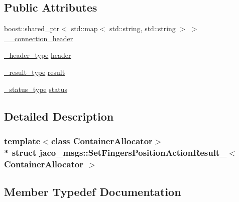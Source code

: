 \subsection*{Public Attributes}
\begin{DoxyCompactItemize}
\item 
boost\+::shared\+\_\+ptr$<$ std\+::map$<$ std\+::string, std\+::string $>$ $>$ \hyperlink{structjaco__msgs_1_1SetFingersPositionActionResult___a891db5c1dd5862e22b11505a18d47d73}{\+\_\+\+\_\+connection\+\_\+header}
\item 
\hyperlink{structjaco__msgs_1_1SetFingersPositionActionResult___adafecfdd9d7d042f35c88e4c41aa2b4f}{\+\_\+header\+\_\+type} \hyperlink{structjaco__msgs_1_1SetFingersPositionActionResult___afe9c9e9a117299f47004490d673fca99}{header}
\item 
\hyperlink{structjaco__msgs_1_1SetFingersPositionActionResult___a0afeedf3b25e89762f7afc0636d21640}{\+\_\+result\+\_\+type} \hyperlink{structjaco__msgs_1_1SetFingersPositionActionResult___a56e4fe7830f94aed326d00adc8cf0ac3}{result}
\item 
\hyperlink{structjaco__msgs_1_1SetFingersPositionActionResult___ac4ef0553517c5a84f08a672d3b0d2c9f}{\+\_\+status\+\_\+type} \hyperlink{structjaco__msgs_1_1SetFingersPositionActionResult___a2071f3ed40cf494554bf7dab9b8da10d}{status}
\end{DoxyCompactItemize}


\subsection{Detailed Description}
\subsubsection*{template$<$class Container\+Allocator$>$\\*
struct jaco\+\_\+msgs\+::\+Set\+Fingers\+Position\+Action\+Result\+\_\+$<$ Container\+Allocator $>$}



\subsection{Member Typedef Documentation}
